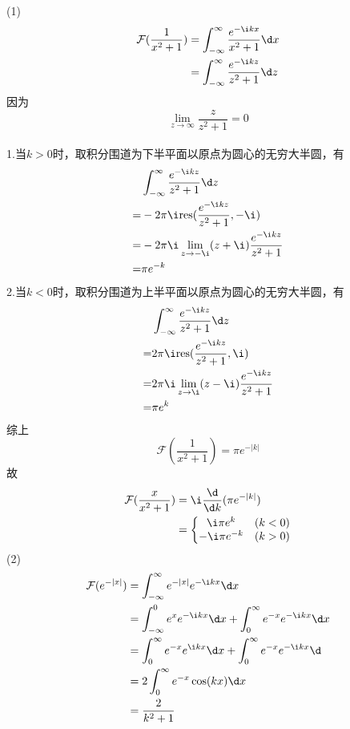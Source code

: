 \documentclass{phyasgn}
\newcommand{\res}{\text{res}}
\newcommand{\F}{\mathcal{F}}
\begin{document}
\begin{sol}[2]
    (1)\begin{align*}
        \F(\frac{1}{x^2+1})&=\int_{-\infty}^{\infty}\frac{e^{-\i kx}}{x^2+1}\d x\\
        &=\int_{-\infty}^{\infty}\frac{e^{-\i kz}}{z^2+1}\d z
    \end{align*}
    因为
    $$\lim_{z\to\infty}\frac{z}{z^2+1}=0$$\\
    1.当$k>0$时，取积分围道为下半平面以原点为圆心的无穷大半圆，有
    \begin{align*}
        &\int_{-\infty}^{\infty}\frac{e^{-\i kz}}{z^2+1}\d z\\
        =&-2\pi \i\res(\frac{e^{-\i kz}}{z^2+1},-\i)\\
        =&-2\pi \i\lim_{z\to-\i}(z+\i)\frac{e^{-\i kz}}{z^2+1}\\
        =&\pi e^{-k}
    \end{align*}
    2.当$k<0$时，取积分围道为上半平面以原点为圆心的无穷大半圆，有
    \begin{align*}
        &\int_{-\infty}^{\infty}\frac{e^{-\i kz}}{z^2+1}\d z\\
        =&2\pi \i\res(\frac{e^{-\i kz}}{z^2+1},\i)\\
        =&2\pi \i\lim_{z\to\i}(z-\i)\frac{e^{-\i kz}}{z^2+1}\\
        =&\pi e^{k}
    \end{align*}
    综上
    $$\F(\frac{1}{x^2+1})=\pi e^{-|k|}$$
    故
    \begin{align*}
        \F(\frac{x}{x^2+1})&=\i\frac{\d }{\d k}(\pi e^{-|k|})\\
        &=\left\{\begin{matrix}
            \i\pi e^{k}&(k<0) \\
            -\i\pi e^{-k}&(k>0)
          \end{matrix}\right.
    \end{align*}
    (2)
    \begin{align*}
        \F(e^{-|x|})&=\int_{-\infty}^{\infty}e^{-|x|}e^{-\i kx}\d x\\
        &=\int_{-\infty}^{0}e^{x}e^{-\i kx}\d x+\int_{0}^{\infty}e^{-x}e^{-\i kx}\d x\\
        &=\int_{0}^{\infty}e^{-x}e^{\i kx}\d x+\int_{0}^{\infty}e^{-x}e^{-\i kx}\d \\
        &=2\int_{0}^{\infty}e^{-x}\cos(kx)\d x\\
        &=\frac{2}{k^2+1}
    \end{align*}
\end{sol}\par
\end{document}
